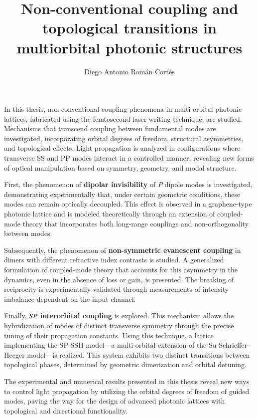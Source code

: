 \documentclass[english, hyphens]{umemoria}
\author{Diego Antonio Román Cortés}
\title{Non-conventional coupling and topological transitions in multiorbital photonic structures}
\begin{document}
\frontmatter
\maketitle

\begin{resumen}\ignorespacesafterend
	In this thesis, non-conventional coupling phenomena in multi-orbital photonic lattices, fabricated using the femtosecond laser writing technique, are studied. Mechanisms that transcend coupling between fundamental modes are investigated, incorporating orbital degrees of freedom, structural asymmetries, and topological effects. Light propagation is analyzed in configurations where transverse SS and PP modes interact in a controlled manner, revealing new forms of optical manipulation based on symmetry, geometry, and modal structure.
	
	First, the phenomenon of \textbf{dipolar invisibility} of $P$ dipole modes is investigated, demonstrating experimentally that, under certain geometric conditions, these modes can remain optically decoupled. This effect is observed in a graphene-type photonic lattice and is modeled theoretically through an extension of coupled-mode theory that incorporates both long-range couplings and non-orthogonality between modes.
	
	Subsequently, the phenomenon of \textbf{non-symmetric evanescent coupling} in dimers with different refractive index contrasts is studied. A generalized formulation of coupled-mode theory that accounts for this asymmetry in the dynamics, even in the absence of loss or gain, is presented. The breaking of reciprocity is experimentally validated through measurements of intensity imbalance dependent on the input channel.
	
	Finally, \( S\hspace{-0.3ex}P \) \textbf{interorbital coupling} is explored. This mechanism allows the hybridization of modes of distinct transverse symmetry through the precise tuning of their propagation constants. Using this technique, a lattice implementing the SP-SSH model—a multi-orbital extension of the Su-Schrieffer-Heeger model—is realized. This system exhibits two distinct transitions between topological phases, determined by geometric dimerization and orbital detuning.
	
	The experimental and numerical results presented in this thesis reveal new ways to control light propagation by utilizing the orbital degrees of freedom of guided modes, paving the way for the design of advanced photonic lattices with topological and directional functionality.
\end{resumen}
\end{document}
